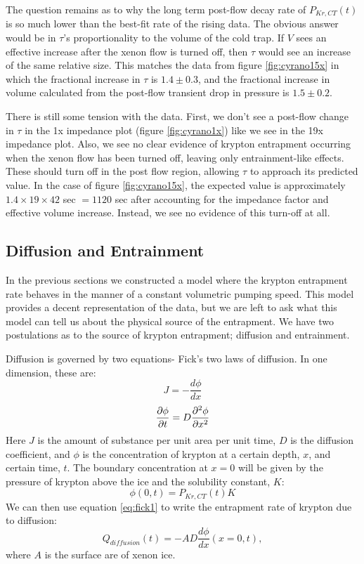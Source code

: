 \documentclass[12pt]{article}
\begin{document}
The question remains as to why the long term post-flow decay rate of $P_{Kr,CT}(t)$ is so much lower than the best-fit rate of the rising data. The obvious answer would be in $\tau$'s proportionality to the volume of the cold trap. If $V$ sees an effective increase after the xenon flow is turned off, then $\tau$ would see an increase of the same relative size. This matches the data from figure \ref{fig:cyrano15x} in which the fractional increase in $\tau$ is $1.4\pm0.3$, and the fractional increase in volume calculated from the post-flow transient drop in pressure is $1.5\pm0.2$. 

There is still some tension with the data. First, we don't see a post-flow change in $\tau$ in the 1x impedance plot (figure \ref{fig:cyrano1x}) like we see in the 19x impedance plot. Also, we see no clear evidence of krypton entrapment occurring when the xenon flow has been turned off, leaving only entrainment-like effects. These should turn off in the post flow region, allowing $\tau$ to approach its predicted value. In the case of figure \ref{fig:cyrano15x}, the expected value is approximately $1.4\times19\times 42$ sec $=1120$ sec after accounting for the impedance factor and effective volume increase. Instead, we see no evidence of this turn-off at all.


\subsection{Diffusion and Entrainment}
In the previous sections we constructed a model where the krypton entrapment rate behaves in the manner of a constant volumetric pumping speed. This model provides a decent representation of the data, but we are left to ask what this model can tell us about the physical source of the entrapment. We have two postulations as to the source of krypton entrapment; diffusion and entrainment. 

Diffusion is governed by two equations- Fick's two laws of diffusion. In one dimension, these are:
\begin{equation} \label{eq:fick1}
J = -\frac{d\phi}{dx}
\end{equation}
\begin{equation}\label{eq:fick2}
{\partial \phi \over \partial t} = D \frac{\partial ^{2} \phi}{\partial x ^2}
\end{equation}
Here $J$ is the amount of substance per unit area per unit time, $D$ is the diffusion coefficient, and $\phi$ is the concentration of krypton at a certain depth, $x$, and certain time, $t$. The boundary concentration at $x=0$ will be given by the pressure of krypton above the ice and the solubility constant, $K$:
\begin{equation}
\phi(0,t)=P_{Kr,CT}(t)K
\end{equation}
We can then use equation \ref{eq:fick1} to write the entrapment rate of krypton due to diffusion:
\begin{equation}
Q_{diffusion}(t)=-AD\frac{d\phi}{dx}(x=0,t),
\end{equation}
where $A$ is the surface are of xenon ice.
\end{document}
